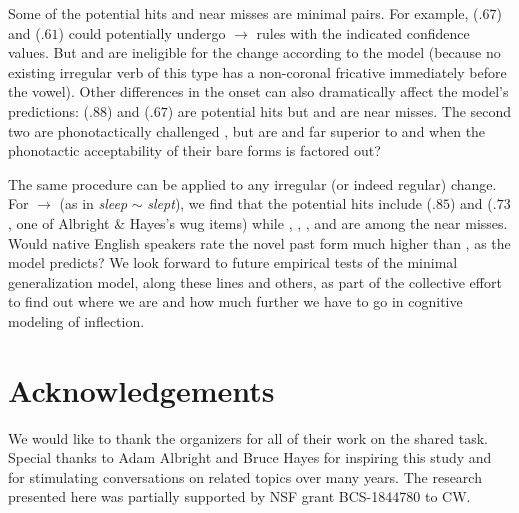 \documentclass[11pt]{article}
\begin{document}
Some of the potential hits and near misses are minimal pairs. For example,  ($.67$) and  ($.61$) could potentially undergo  $\to$  rules with the indicated confidence values. But  and  are ineligible for the change according to the model (because no existing irregular verb of this type has a non-coronal fricative immediately before the vowel). Other differences in the onset can also dramatically affect the model's predictions:  ($.88$) and  ($.67$) are potential hits but  and  are near misses. The second two are phonotactically challenged \citep{davis-1989-cross}, but are  and  far superior to  and  when the phonotactic acceptability of their bare forms is factored out?

The same procedure can be applied to any irregular (or indeed regular) change. For  $\to$  (as in \emph{sleep} $\sim$ \emph{slept}), we find that the potential hits include  ($.85$) and  ($.73$, one of Albright \& Hayes's wug items) while , , , and  are among the near misses. Would native English speakers rate the novel past form  much higher than , as the model predicts? We look forward to future empirical tests of the minimal generalization model, along these lines and others, as part of the collective effort to find out where we are and how much further we have to go in cognitive modeling of inflection.


\section*{Acknowledgements}

We would like to thank the organizers for all of their work on the shared task. Special thanks to Adam Albright and Bruce Hayes for inspiring this study and for stimulating conversations on related topics over many years. The research presented here was partially supported by NSF grant BCS-1844780 to CW.






\appendix


\end{document}
